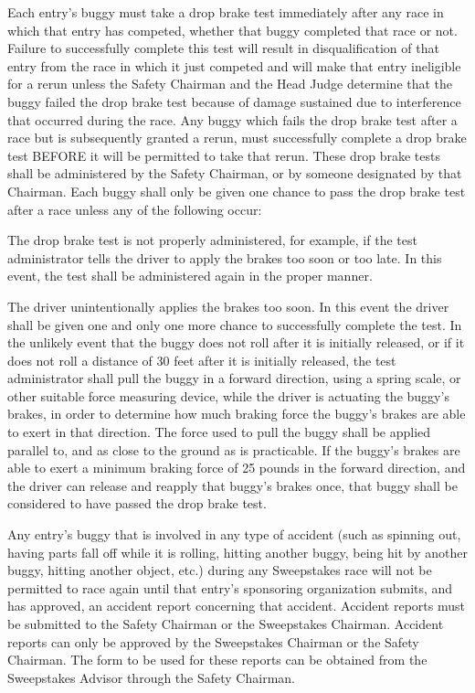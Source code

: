 Each entry's buggy must take a drop brake test immediately after any race in which that entry has competed, whether that buggy completed that race or not. Failure to successfully complete this test will result in disqualification of that entry from the race in which it just competed and will make that entry ineligible for a rerun unless the Safety Chairman and the Head Judge determine that the buggy failed the drop brake test because of damage sustained due to interference that occurred during the race. Any buggy which fails the drop brake test after a race but is subsequently granted a rerun, must successfully complete a drop brake test BEFORE it will be permitted to take that rerun. These drop brake tests shall be administered by the Safety Chairman, or by someone designated by that Chairman. Each buggy shall only be given one chance to pass the drop brake test after a race unless any of the following occur:

The drop brake test is not properly administered, for example, if the test administrator tells the driver to apply the brakes too soon or too late. In this event, the test shall be administered again in the proper manner.

The driver unintentionally applies the brakes too soon. In this event the driver shall be given one and only one more chance to successfully complete the test. In the unlikely event that the buggy does not roll after it is initially released, or if it does not roll a distance of 30 feet after it is initially released, the test administrator shall pull the buggy in a forward direction, using a spring scale, or other suitable force measuring device, while the driver is actuating the buggy's brakes, in order to determine how much braking force the buggy's brakes are able to exert in that direction. The force used to pull the buggy shall be applied parallel to, and as close to the ground as is practicable. If the buggy's brakes are able to exert a minimum braking force of 25 pounds in the forward direction, and the driver can release and reapply that buggy's brakes once, that buggy shall be considered to have passed the drop brake test.

Any entry's buggy that is involved in any type of accident (such as spinning out, having parts fall off while it is rolling, hitting another buggy, being hit by another buggy, hitting another object, etc.) during any Sweepstakes race will not be permitted to race again until that entry's sponsoring organization submits, and has approved, an accident report concerning that accident. Accident reports must be submitted to the Safety Chairman or the Sweepstakes Chairman. Accident reports can only be approved by the Sweepstakes Chairman or the Safety Chairman. The form to be used for these reports can be obtained from the Sweepstakes Advisor through the Safety Chairman.

